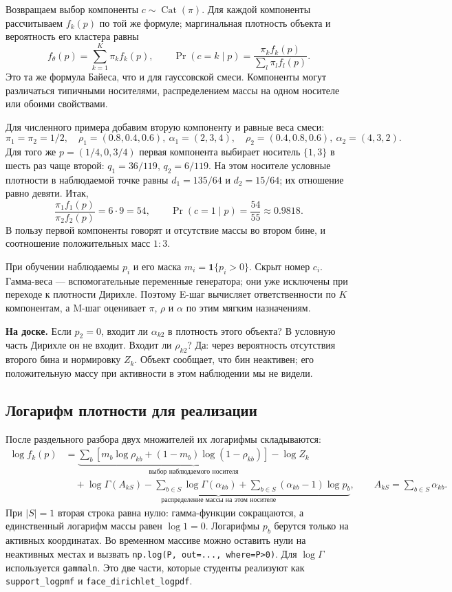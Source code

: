 \documentclass[11pt,a4paper]{article}
\newcommand{\board}[1]{\par\textbf{На доске.} #1\par}
\begin{document}
Возвращаем выбор компоненты $c\sim\operatorname{Cat}(\pi)$.
Для каждой компоненты рассчитываем $f_k(p)$ по той же формуле;
маргинальная плотность объекта и вероятность его кластера равны
\[
 f_\theta(p)=\sum_{k=1}^K\pi_kf_k(p),\qquad
 \Pr(c=k\mid p)=\frac{\pi_kf_k(p)}{\sum_l\pi_lf_l(p)}.
\]
Это та же формула Байеса, что и для гауссовской смеси. Компоненты могут
различаться типичными носителями, распределением массы на одном носителе
или обоими свойствами.

Для численного примера добавим вторую компоненту и равные веса смеси:
\[
 \pi_1=\pi_2=1/2,\quad
 \rho_1=(0.8,0.4,0.6),\ \alpha_1=(2,3,4),\quad
 \rho_2=(0.4,0.8,0.6),\ \alpha_2=(4,3,2).
\]
Для того же $p=(1/4,0,3/4)$ первая компонента выбирает носитель
$\{1,3\}$ в шесть раз чаще второй: $q_1=36/119$, $q_2=6/119$.
На этом носителе условные плотности в наблюдаемой точке равны
$d_1=135/64$ и $d_2=15/64$; их отношение равно девяти.
Итак,
\[
 \frac{\pi_1f_1(p)}{\pi_2f_2(p)}=6\cdot9=54,\qquad
 \Pr(c=1\mid p)=\frac{54}{55}\approx0.9818.
\]
В пользу первой компоненты говорят и отсутствие массы во втором бине,
и соотношение положительных масс $1:3$.

При обучении наблюдаемы $p_i$ и его маска $m_i=\mathbf1\{p_i>0\}$.
Скрыт номер $c_i$. Гамма-веса --- вспомогательные переменные генератора;
они уже исключены при переходе к плотности Дирихле. Поэтому E-шаг
вычисляет ответственности по $K$ компонентам, а M-шаг оценивает
$\pi$, $\rho$ и $\alpha$ по этим мягким назначениям.

\board{Если $p_2=0$, входит ли $\alpha_{k2}$ в плотность этого объекта?
В условную часть Дирихле он не входит. Входит ли $\rho_{k2}$?
Да: через вероятность отсутствия второго бина и нормировку $Z_k$.
Объект сообщает, что бин неактивен; его положительную массу при
активности в этом наблюдении мы не видели.}

\subsection{Логарифм плотности для реализации}

После раздельного разбора двух множителей их логарифмы складываются:
\begin{align*}
 \log f_k(p)
 &=\underbrace{\sum_b[m_b\log\rho_{kb}+(1-m_b)\log(1-\rho_{kb})]
                         -\log Z_k}_{\text{выбор наблюдаемого носителя}}\\
 &\quad+\underbrace{\log\Gamma(A_{kS})
                -\sum_{b\in S}\log\Gamma(\alpha_{kb})
                +\sum_{b\in S}(\alpha_{kb}-1)\log p_b}_{
                         \text{распределение массы на этом носителе}},
 \qquad A_{kS}=\sum_{b\in S}\alpha_{kb}.
\end{align*}
При $|S|=1$ вторая строка равна нулю: гамма-функции сокращаются,
а единственный логарифм массы равен $\log1=0$.
Логарифмы $p_b$ берутся только на активных координатах.
Во временном массиве можно оставить нули на неактивных местах и вызвать
\texttt{np.log(P, out=..., where=P>0)}. Для $\log\Gamma$ используется
\texttt{gammaln}. Это две части, которые студенты реализуют как
\texttt{support\_logpmf} и \texttt{face\_dirichlet\_logpdf}.
\end{document}
